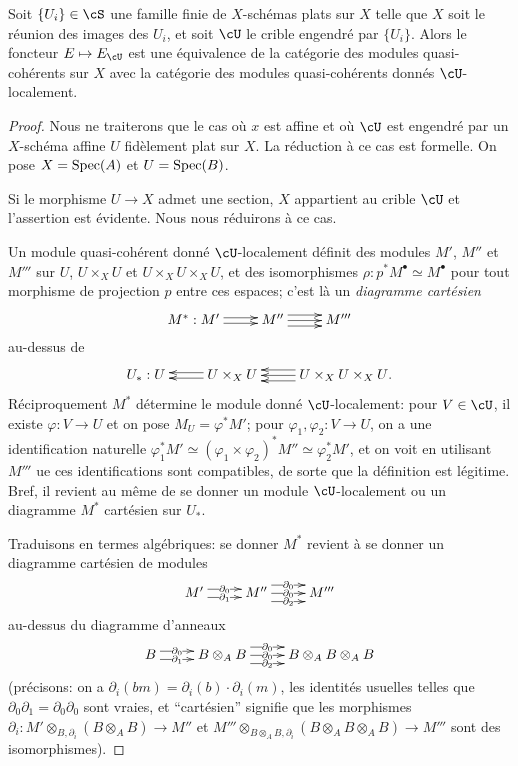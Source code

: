 \begin{theorem}\label{I:1-4-5}
Soit $\{U_i\}\in\cS$ une famille finie de $X$-schémas plats sur $X$ telle que 
$X$ soit le réunion des images des $U_i$, et soit $\cU$ le crible engendré par 
$\{U_i\}$. Alors le foncteur $E\mapsto E_\cU$ est une équivalence de la 
catégorie des modules quasi-cohérents sur $X$ avec la catégorie des modules 
quasi-cohérents donnés $\cU$-localement.
\end{theorem}
\begin{proof}
Nous ne traiterons que le cas où $x$ est affine et où $\cU$ est engendré par 
un $X$-schéma affine $U$ fidèlement plat sur $X$. La réduction à ce cas est 
formelle. On pose $X=\operatorname{Spec}(A)$ et $U=\operatorname{Spec}(B)$. 

Si le morphisme $U\to X$ admet une section, $X$ appartient au crible $\cU$ et 
l'assertion est évidente. Nous nous réduirons à ce cas. 

Un module quasi-cohérent donné $\cU$-localement définit des modules $M'$, $M''$ 
et $M'''$ sur $U$, $U\times_X U$ et $U\times_X U\times_X U$, et des 
isomorphismes $\rho:p^* M^\bullet\simeq M^\bullet$ pour tout morphisme de 
projection $p$ entre ces espaces; c'est là un \emph{diagramme cartésien} 
\[\xymatrix{
  M^* : M' \ar@<2pt>[r] \ar@<-2pt>[r] 
    & M'' \ar[r] \ar@<4pt>[r] \ar@<-4pt>[r] 
    & M'''
}\]
au-dessus de 
\[\xymatrix{
  U_* : U 
    & U\times_X U \ar@<2pt>[l] \ar@<-2pt>[l] 
    & U\times_X U\times_X U \ar[l] \ar@<4pt>[l] \ar@<-4pt>[l] \mbox{.}
}\]
Réciproquement $M^*$ détermine le module donné $\cU$-localement: pour 
$V\in\cU$, il existe $\varphi:V\to U$ et on pose $M_U=\varphi^* M'$; 
pour $\varphi_1,\varphi_2:V\to U$, on a une identification naturelle 
$\varphi_1^* M'\simeq (\varphi_1\times \varphi_2)^* M'' \simeq \varphi_2^* M'$, 
et on voit en utilisant $M'''$ ue ces identifications sont compatibles, de 
sorte que la définition est légitime. Bref, il revient au même de se donner un 
module $\cU$-localement ou un diagramme $M^*$ cartésien sur $U_*$. 

Traduisons en termes algébriques: se donner $M^*$ revient à se donner un 
diagramme cartésien de modules 
\[\xymatrix{
  M' \ar@<3pt>[r]|-{\partial_0} \ar@<-3pt>[r]|-{\partial_1} 
    & M'' \ar@<6pt>[r]|-{\partial_0} \ar[r]|-{\partial_0} \ar@<-6pt>[r]|-{\partial_2}
    & M'''
}\]
au-dessus du diagramme d'anneaux 
\[\xymatrix{
  B \ar@<3pt>[r]|-{\partial_0} \ar@<-3pt>[r]|-{\partial_1} 
    & B\otimes_A B \ar@<6pt>[r]|-{\partial_0} \ar[r]|-{\partial_0} \ar@<-6pt>[r]|-{\partial_2} 
    & B\otimes_A B\otimes_A B
}\]
(précisons: on a $\partial_i(b m)=\partial_i(b)\cdot\partial_i(m)$, les 
identités usuelles telles que $\partial_0\partial_1=\partial_0\partial_0$ 
sont vraies, et ``cartésien'' signifie que les morphismes 
$\partial_i:M'\otimes_{B,\partial_i}(B\otimes_A B)\to M''$ et 
$M'''\otimes_{B\otimes_A B,\partial_i}(B\otimes_A B\otimes_A B)\to M'''$ sont 
des isomorphismes). 


\end{proof}
